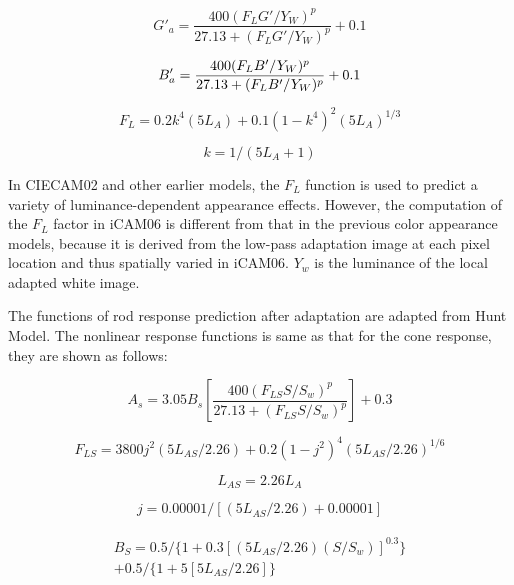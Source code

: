 \documentclass[10pt,twocolumn,letterpaper]{article}
\begin{document}
\begin{equation}
	G'_a = \frac{400(F_LG'/Y_W)^p}{27.13+(F_LG'/Y_W)^p}+0.1
\end{equation}

\begin{equation}
	B'_a = \frac{400(F_LB'/Y_W)^p}{27.13+(F_LB'/Y_W)^p}+0.1\\
\end{equation}

\begin{equation}
	F_L=0.2k^4(5L_A)+0.1(1-k^4)^2(5L_A)^{1/3}
\end{equation}

\begin{equation}
	k=1/(5L_A+1)
\end{equation}

In CIECAM02 and other earlier models, the $F_L$ function is used to predict a variety of luminance-dependent appearance effects. However, the computation of the $F_L$ factor in iCAM06 is different from that in the previous color appearance models, because it is derived from the low-pass adaptation image at each pixel location and thus spatially varied in iCAM06. $Y_w$ is the luminance of the local adapted white image.

The functions of rod response prediction after adaptation are adapted from Hunt Model\cite{hunt1967reproduction}. The nonlinear response functions is same as that for the cone response, they are shown as follows:

\begin{equation}
	A_s = 3.05B_s[\frac{400(F_{LS}S/S_w)^p}{27.13+(F_{LS}S/S_w)^p}] + 0.3
\end{equation}

\begin{equation}
	F_{LS}=3800j^2(5L_{AS}/2.26)+0.2(1-j^2)^4(5L_{AS}/2.26)^{1/6}
\end{equation}

\begin{equation}
	L_{AS}=2.26L_A
\end{equation}

\begin{equation}
	j=0.00001/[(5L_{AS}/2.26)+0.00001]
\end{equation}

\begin{align}
\begin{aligned}
	B_S = 0.5/\{1+0.3[(5L_{AS}/2.26)(S/S_w)]^{0.3}\}\\
		+0.5/\{1+5[5L_{AS}/2.26]\}
\end{aligned}
\end{align}
\end{document}
